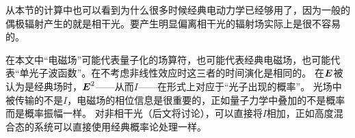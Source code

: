从本节的计算中也可以看到为什么很多时候经典电动力学已经够用了，因为一般的偶极辐射产生的就是相干光。要产生明显偏离相干光的辐射场实际上是很不容易的。

在本文中“电磁场”可能代表量子化的场算符，也可能代表经典电磁场，也可能代表“单光子波函数”。在不考虑非线性效应时这三者的时间演化是相同的。
在$\vb*{E}$被认为是经典场时，$\vb*{E}^2$——从而$I$——在形式上对应于“光子出现的概率”。
光场中被传输的不是$I$，电磁场的相位信息是很重要的，正如量子力学中叠加的不是概率而是概率振幅一样。
对非相干光（后文将讨论），可以直接将$I$相加，正如高度混合态的系统可以直接使用经典概率论处理一样。
